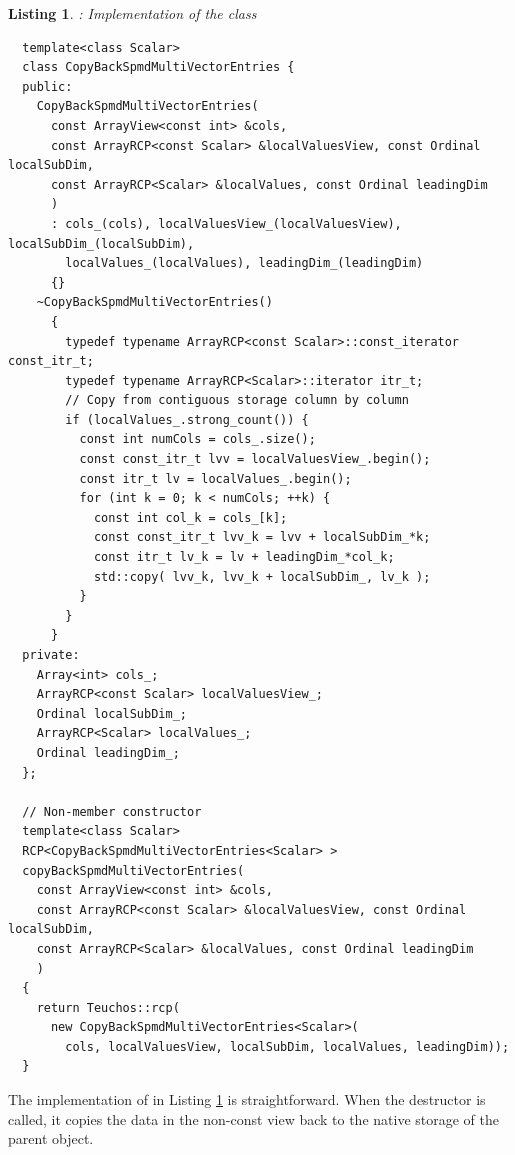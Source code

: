 \documentclass[pdf,ps2pdf,11pt]{SANDreport}
\newtheorem{listing}{Listing}
\begin{document}
{}\begin{listing}: Implementation of the class
{}
\label{listing:CopyBackSpmdMultiVectorEntries}
{\small\begin{verbatim}
  template<class Scalar>
  class CopyBackSpmdMultiVectorEntries {
  public:
    CopyBackSpmdMultiVectorEntries(
      const ArrayView<const int> &cols,
      const ArrayRCP<const Scalar> &localValuesView, const Ordinal localSubDim,
      const ArrayRCP<Scalar> &localValues, const Ordinal leadingDim
      )
      : cols_(cols), localValuesView_(localValuesView), localSubDim_(localSubDim),
        localValues_(localValues), leadingDim_(leadingDim)
      {}
    ~CopyBackSpmdMultiVectorEntries()
      {
        typedef typename ArrayRCP<const Scalar>::const_iterator const_itr_t;
        typedef typename ArrayRCP<Scalar>::iterator itr_t;
        // Copy from contiguous storage column by column
        if (localValues_.strong_count()) {
          const int numCols = cols_.size();
          const const_itr_t lvv = localValuesView_.begin();
          const itr_t lv = localValues_.begin();
          for (int k = 0; k < numCols; ++k) {
            const int col_k = cols_[k];
            const const_itr_t lvv_k = lvv + localSubDim_*k;
            const itr_t lv_k = lv + leadingDim_*col_k;
            std::copy( lvv_k, lvv_k + localSubDim_, lv_k );
          }
        }
      }
  private:
    Array<int> cols_;
    ArrayRCP<const Scalar> localValuesView_;
    Ordinal localSubDim_;
    ArrayRCP<Scalar> localValues_;
    Ordinal leadingDim_;
  };

  // Non-member constructor  
  template<class Scalar>
  RCP<CopyBackSpmdMultiVectorEntries<Scalar> >
  copyBackSpmdMultiVectorEntries(
    const ArrayView<const int> &cols,
    const ArrayRCP<const Scalar> &localValuesView, const Ordinal localSubDim,
    const ArrayRCP<Scalar> &localValues, const Ordinal leadingDim
    )
  {
    return Teuchos::rcp(
      new CopyBackSpmdMultiVectorEntries<Scalar>(
        cols, localValuesView, localSubDim, localValues, leadingDim));
  }
\end{verbatim}}
\end{listing}


The implementation of {} in
Listing {}\ref{listing:CopyBackSpmdMultiVectorEntries} is
straightforward.  When the destructor is called, it copies the data in
the non-const view back to the native storage of the parent
{} object.
\end{document}
